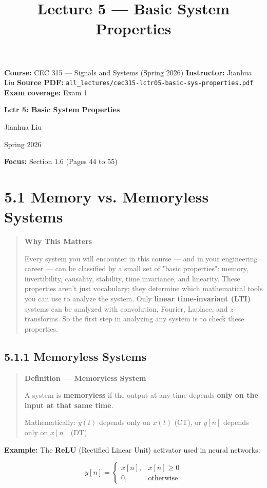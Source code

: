 \documentclass[11pt]{article}
\title{Lecture 5 — Basic System Properties}
\author{}
\date{}
\begin{document}
\maketitle

\textbf{Course:} CEC 315 — Signals and Systems (Spring 2026)
\textbf{Instructor:} Jianhua Liu
\textbf{Source PDF:} \texttt{all\_lectures/cec315-lctr05-basic-sys-properties.pdf}
\textbf{Exam coverage:} Exam 1

\textbf{Lctr 5: Basic System Properties}

Jianhua Liu

Spring 2026

\textbf{Focus:} Section 1.6 (Pages 44 to 55)

\section*{5.1 Memory vs. Memoryless Systems}

\begin{quote}
\textbf{Why This Matters}

Every system you will encounter in this course — and in your engineering career — can be classified by a small set of "basic properties": memory, invertibility, causality, stability, time invariance, and linearity. These properties aren't just vocabulary; they determine which mathematical tools you can use to analyze the system. Only \textbf{linear time-invariant (LTI)} systems can be analyzed with convolution, Fourier, Laplace, and $z$-transforms. So the first step in analyzing any system is to check these properties.
\end{quote}

\subsection*{5.1.1 Memoryless Systems}

\begin{quote}
\textbf{Definition — Memoryless System}

A system is \textbf{memoryless} if the output at any time depends \textbf{only on the input at that same time}.

Mathematically: $y(t)$ depends only on $x(t)$ (CT), or $y[n]$ depends only on $x[n]$ (DT).
\end{quote}

\textbf{Example:} The \textbf{ReLU} (Rectified Linear Unit) activator used in neural networks:

\[y[n] = \begin{cases} x[n], & x[n] \geq 0 \\ 0, & \text{otherwise}\end{cases}\]
\end{document}
